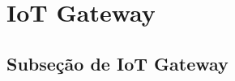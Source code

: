\section{IoT Gateway}
\label{sec:iotGateway}

\subsection{Subseção de IoT Gateway}
\label{subsec:iotGateway}